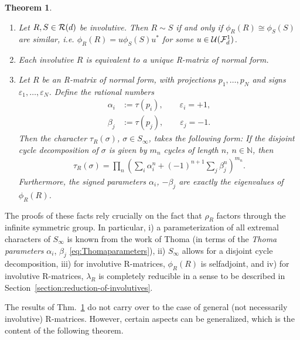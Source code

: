 \documentclass[12pt,a4paper]{amsart}
\numberwithin{equation}{section}
\newtheorem{theorem}{Theorem}[section]
\theoremstyle{remark}
\newcommand{\Nl}{\mathbb{N}}
\newcommand{\la}{\lambda}
\newcommand{\eps}{\varepsilon}
\newcommand{\CU}[0]{\mathcal{U}} \newcommand{\CV}[0]{\mathcal{V}}
\begin{document}
\begin{theorem}\label{theorem:involutivecase}\cite{LechnerPennigWood:2019}
    \leavevmode
    \begin{enumerate}
     \item Let $R,S\in\mathcal{R}(d)$ be involutive. Then $R\sim S$ if and only if $\phi_R(R)\cong\phi_S(S)$ are similar, i.e. $\phi_R(R)=u\phi_S(S)u^*$ for some $u\in\CU(\CF_d^1)$.
     \item\label{item:normalform-invol} Each involutive $R$ is equivalent to a unique R-matrix of normal form. 
     \item Let $R$ be an R-matrix of normal form, with projections $p_1,\ldots,p_N$ and signs $\eps_1,\ldots,\eps_N$. Define the rational numbers 
        \begin{align}\label{eq:Thomaparameters}
            \alpha_i&:=\tau(p_i),\qquad \eps_{i}=+1,\\
            \beta_j&:=\tau(p_j),\qquad \eps_{j}=-1.
        \end{align}
    Then the character $\tau_R(\sigma)$, $\sigma\in S_\infty$, takes the following form: If the disjoint cycle decomposition of $\sigma$ is given by $m_n$ cycles of length $n$, $n\in\Nl$, then 
    \begin{align}\label{eq:ThomaCharacterFormula}
        \tau_R(\sigma)=\prod_n\left(\sum_i\alpha_i^n+(-1)^{n+1}\sum_j\beta_j^n\right)^{m_n}.
    \end{align}
    Furthermore, the signed parameters $\alpha_i$, $-\beta_j$ are exactly the eigenvalues of $\phi_R(R)$.
    \end{enumerate}
\end{theorem}

The proofs of these facts rely crucially on the fact that $\rho_R$ factors through the infinite symmetric group. In particular, i) a parameterization of all extremal characters of $S_\infty$ is known from the work of Thoma \cite{Thoma:1964} (in terms of the {\em Thoma parameters} $\alpha_i$, $\beta_j$ \eqref{eq:Thomaparameters}), ii) $S_\infty$ allows for a disjoint cycle decomposition, iii) for involutive R-matrices, $\phi_R(R)$ is selfadjoint, and iv) for involutive R-matrices, $\la_R$ is completely reducible in a sense to be described in Section~\ref{section:reduction-of-involutives}.

The results of Thm.~\ref{theorem:involutivecase} do not carry over to the case of general (not necessarily involutive) R-matrices. However, certain aspects can be generalized, which is the content of the following theorem.
\end{document}
